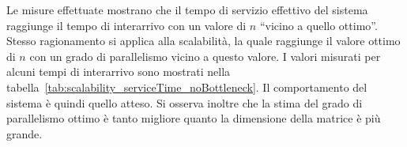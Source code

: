 \begin{description}
Le misure effettuate mostrano che il tempo di servizio effettivo del sistema raggiunge il tempo di interarrivo con un valore di $n$ ``vicino a quello ottimo''. Stesso ragionamento si applica alla scalabilit\`a, la quale raggiunge il valore ottimo di $n$ con un grado di parallelismo vicino a questo valore. I valori misurati per alcuni tempi di interarrivo sono mostrati nella tabella~\ref{tab:scalability_serviceTime_noBottleneck}. Il comportamento del sistema \`e quindi quello atteso. Si osserva inoltre che la stima del grado di parallelismo ottimo \`e tanto migliore quanto la dimensione della matrice \`e pi\`u grande.
\end{description}      



\FloatBarrier





\FloatBarrier

